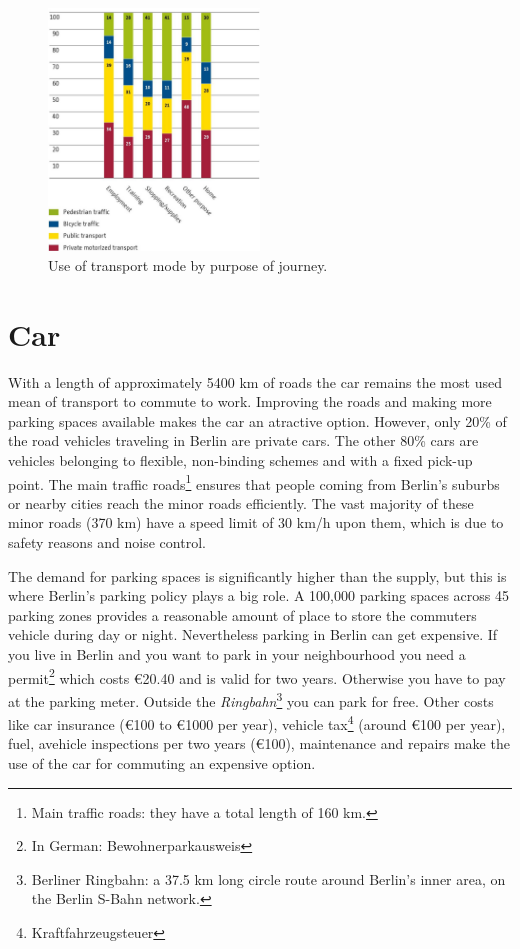 \begin{figure}
	\includegraphics[width=0.5\textwidth]{MobilityInTheCityJPG/Graphs/UseOfTransportPurpose.jpg}
	\centering
	\caption{Use of transport mode by purpose of journey.\cite{MobilityCity}}
\end{figure}
\section{Car}
With a length of approximately 5400 km of roads the car remains the most used mean of transport to commute to work. Improving the roads and making more parking spaces available makes the car an atractive option. However, only 20\% of the road vehicles traveling in Berlin are private cars. The other 80\% cars are vehicles belonging to flexible, non-binding schemes and with a fixed pick-up point.  The main traffic roads\footnote{Main traffic roads: they have a total length of 160 km.} ensures that people coming from Berlin's suburbs or nearby cities reach the minor roads efficiently. The vast majority of these minor roads (370 km) have a speed limit of 30 km/h upon them, which is due to safety reasons and noise control. 

The demand for parking spaces is significantly higher than the supply, but this is where Berlin's parking policy plays a big role. A 100,000 parking spaces across 45 parking zones provides a reasonable amount of place to store the commuters vehicle during day or night. Nevertheless parking in Berlin can get expensive. If you live in Berlin and you want to park in your neighbourhood you need a permit\footnote{In German: Bewohnerparkausweis} which costs €20.40 and is valid for two years. Otherwise you have to pay at the parking meter. Outside the \textit{Ringbahn}\footnote{Berliner Ringbahn: a 37.5 km long circle route around Berlin's inner area, on the Berlin S-Bahn network.} you can park for free. Other costs like car insurance (€100 to €1000 per year), vehicle tax\footnote{Kraftfahrzeugsteuer} (around €100 per year), fuel, avehicle inspections per two years (€100), maintenance and repairs make the use of the car for commuting an expensive option.





